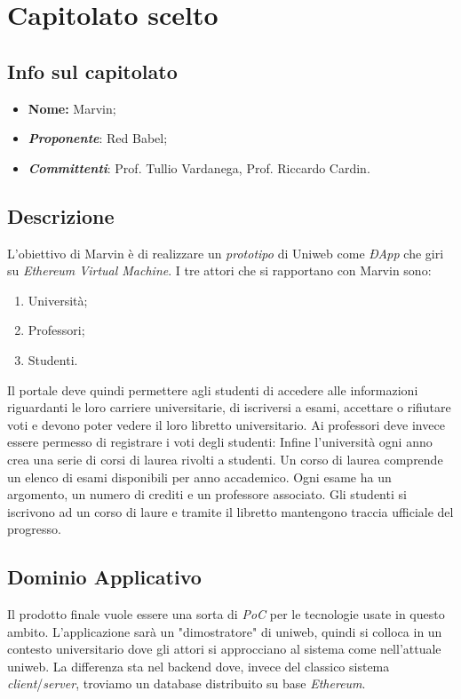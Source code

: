\newpage
\section{Capitolato scelto}
\subsection{Info sul capitolato}
\begin{itemize}
	\item \textbf{Nome:} Marvin;
	\item \textbf{\textit{Proponente}}: Red Babel;
	\item \textbf{\textit{Committenti}}: Prof. Tullio Vardanega, Prof. Riccardo Cardin.
\end{itemize}

\subsection{Descrizione}
L'obiettivo di Marvin è di realizzare un \textit{prototipo} di Uniweb come \textit{ÐApp} che giri su \textit{Ethereum Virtual Machine}. I tre attori che si rapportano con Marvin sono:
\begin{enumerate}
	\item Università;
	\item Professori;
	\item Studenti.
\end{enumerate}
Il portale deve quindi permettere agli studenti di accedere alle informazioni riguardanti le loro carriere universitarie, di iscriversi a esami, accettare o rifiutare voti e devono poter vedere il loro libretto universitario.
Ai professori deve invece essere permesso di registrare i voti degli studenti:
Infine l'università ogni anno crea una serie di corsi di laurea rivolti a studenti. Un corso di laurea comprende un elenco di esami disponibili per anno accademico. Ogni esame ha un argomento, un numero di crediti e un professore associato. Gli studenti si iscrivono ad un corso di laure e tramite il libretto mantengono traccia ufficiale del progresso.

\subsection{Dominio Applicativo}
Il prodotto finale vuole essere una sorta di \textit{PoC} per le tecnologie usate in questo ambito. L'applicazione sarà un "dimostratore" di uniweb, quindi si colloca in un contesto universitario dove gli attori si approcciano al sistema come nell'attuale uniweb. La differenza sta nel backend dove, invece del classico sistema \textit{client}/\textit{server}, troviamo un database distribuito su base \textit{Ethereum}. 

